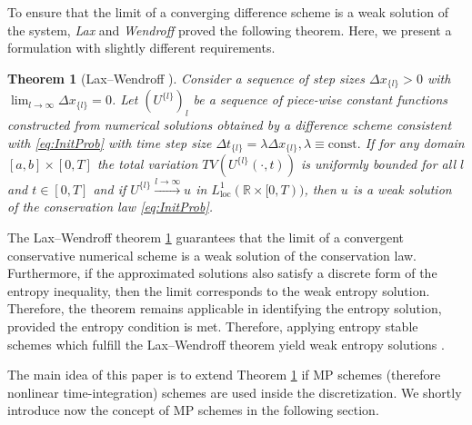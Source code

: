 \documentclass[final,11pt, times, linenumber, nopreprintline]{elsarticle}
\newcommand{\R}{\mathbb{R}}
\newcommand{\C}{\mathbb{C}}
\newcommand{\bU}{\bm U}
\newcommand{\bphi}{ \varphi}
\newtheorem{thm}{Theorem}
\begin{document}
To ensure that the limit of a converging difference scheme is a weak solution of the system, \textit{Lax} and \textit{Wendroff} \cite{lax_systems_1960} proved the following theorem. Here, we present a formulation with slightly different requirements.
%
%
%
%
\begin{thm}[Lax--Wendroff \cite{leveque_numerical_1992}]
	Consider a sequence of step sizes $\Delta x_{\{l\}} > 0$ with  $ \lim_{l{ \rightarrow \infty}} \Delta x_{\{l\}} = 0$. Let $\left( U^{\{l\}} \right)_l $ be a sequence of piece-wise constant functions constructed from numerical solutions obtained by a difference scheme consistent with \eqref{eq:InitProb} with time step size $\Delta t_{\{l\}} = \lambda \Delta x_{\{l\}}, \lambda \equiv \mathrm{const}.$ If  for any domain $[a,b]\times [0,T]$  the total variation $TV \left(U^{\{l\}}(\cdot, t)\right)$ is uniformly bounded for all $l$ and $t \in [0,T]$ and if $U^{\{l\}}\xrightarrow{l \rightarrow \infty} u$ in $L^1_{\mathrm{loc}}(\R\times [0,T))$, then $u$ is a weak solution of the conservation law \eqref{eq:InitProb}.
	\label{thm:LW}
\end{thm}
\begin{rmk} The Lax--Wendroff theorem \ref{thm:LW} guarantees that the limit of a convergent conservative numerical scheme is a weak solution of the conservation law. Furthermore, if the approximated solutions also satisfy a discrete form of the entropy inequality, then the limit corresponds to the weak entropy solution. Therefore, the theorem remains applicable in identifying the entropy solution, provided the entropy condition is met. Therefore, applying entropy stable schemes which fulfill the Lax--Wendroff theorem yield weak entropy solutions \cite{Tadmor2003,CF2013,fisher20213,godlewski_numerical_1996}. 
\end{rmk}
The main idea of this paper is to extend Theorem \ref{thm:LW} if MP schemes (therefore nonlinear time-integration) schemes are used inside the discretization. We shortly introduce now the concept of MP schemes in the following section.  
\end{document}
